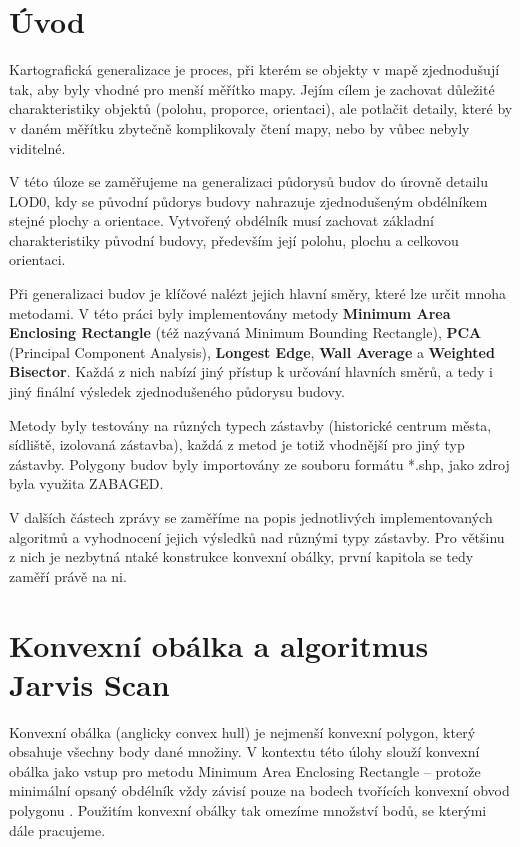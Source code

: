 \documentclass[a4paper,12pt]{article}
\begin{document}
\section{Úvod}
Kartografická generalizace je proces, při kterém se objekty v mapě zjednodušují tak, aby byly vhodné pro menší měřítko mapy. Jejím cílem je zachovat důležité charakteristiky objektů (polohu, proporce, orientaci), ale potlačit detaily, které by v daném měřítku zbytečně komplikovaly čtení mapy, nebo by vůbec nebyly viditelné.

V této úloze se zaměřujeme na generalizaci půdorysů budov do úrovně detailu LOD0, kdy se původní půdorys budovy nahrazuje zjednodušeným obdélníkem stejné plochy a orientace. Vytvořený obdélník musí zachovat základní charakteristiky původní budovy, především její polohu, plochu a celkovou orientaci.

Při generalizaci budov je klíčové nalézt jejich hlavní směry, které lze určit mnoha metodami. V této práci byly implementovány metody \textbf{Minimum Area Enclosing Rectangle} (též nazývaná Minimum Bounding Rectangle), \textbf{PCA} (Principal Component Analysis), \textbf{Longest Edge}, \textbf{Wall Average} a \textbf{Weighted Bisector}. Každá z nich nabízí jiný přístup k určování hlavních směrů, a tedy i jiný finální výsledek zjednodušeného půdorysu budovy.

Metody byly testovány na různých typech zástavby (historické centrum města, sídliště, izolovaná zástavba), každá z metod je totiž vhodnější pro jiný typ zástavby. Polygony budov byly importovány ze souboru formátu *.shp, jako zdroj byla využita ZABAGED.

V dalších částech zprávy se zaměříme na popis jednotlivých implementovaných algoritmů a vyhodnocení jejich výsledků nad různými typy zástavby. Pro většinu z nich je nezbytná ntaké konstrukce konvexní obálky, první kapitola se tedy zaměří právě na ni.




\section{Konvexní obálka a algoritmus Jarvis Scan}
Konvexní obálka (anglicky convex hull) je nejmenší konvexní polygon, který obsahuje všechny body dané množiny. V kontextu této úlohy slouží konvexní obálka jako vstup pro metodu Minimum Area Enclosing Rectangle – protože minimální opsaný obdélník vždy závisí pouze na bodech tvořících konvexní obvod polygonu \parencite{bayer_prednaska}. Použitím konvexní obálky tak omezíme množství bodů, se kterými dále pracujeme.
\end{document}

